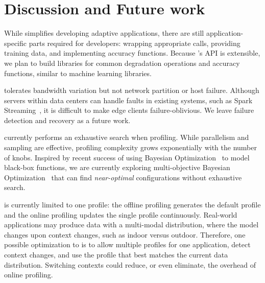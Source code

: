 \section{Discussion and Future work}
\label{sec:discussion}

 While \awstream{} simplifies developing
adaptive applications, there are still application-specific parts required for
developers: wrapping appropriate \maybe{} calls, providing training data, and
implementing accuracy functions. Because \awstream{}'s API is extensible, we plan
to build libraries for common degradation operations and accuracy functions,
similar to machine learning libraries.

 \awstream{} tolerates bandwidth variation
but not network partition or host failure. Although servers within data centers
can handle faults in existing systems, such as Spark
Streaming~\cite{zaharia2013discretized}, it is difficult to make edge clients
failure-oblivious.  We leave failure detection and recovery as a future work.

 \awstream{} currently performs an exhaustive search when
profiling. While parallelism and sampling are effective, profiling complexity
grows exponentially with the number of knobs. Inspired by recent success of
using Bayesian Optimization~\cite{snoek2012practical, alipourfard2017cherrypick,
  solnik2017bayesian} to model black-box functions, we are currently exploring
multi-objective Bayesian Optimization~\cite{hernandez2016predictive} that can
find \textit{near-optimal} configurations without exhaustive search.


 \awstream{} is currently limited to one profile: the
offline profiling generates the default profile and the online profiling
updates the single profile continuously.  Real-world applications may produce
data with a multi-modal distribution, where the model changes upon context
changes, such as indoor versus outdoor. Therefore, one possible optimization
to \awstream{} is to allow multiple profiles for one application, detect
context changes, and use the profile that best matches the current data
distribution.  Switching contexts could reduce, or even eliminate, the
overhead of online profiling.

